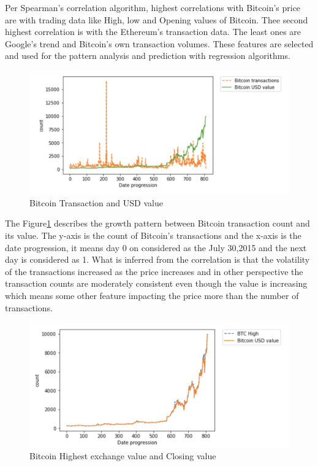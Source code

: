 \documentclass[sigconf]{acmart}
\begin{document}
Per Spearman's correlation algorithm, highest correlations with Bitcoin's price are with trading data like High, low and Opening values of Bitcoin. Thee second highest correlation is with the Ethereum's transaction data. The least ones are Google's trend and Bitcoin's own transaction volumes.
These features are selected and used for the pattern analysis and prediction with regression algorithms. 


\begin{figure}[!ht]
  \centering\includegraphics[width=\columnwidth]{images/BTC-prcvsBTC-trans.png}
  \caption{Bitcoin Transaction and USD value }
  \label{1}
\end{figure}

The Figure\ref{1} describes the growth pattern between Bitcoin transaction count and its value. The y-axis is the count of Bitcoin's transactions and the x-axis is the date progression, it means day 0 on considered as the July 30,2015 and the next day is considered as 1. What is inferred from the correlation is that the volatility of the transactions increased as the price increases and in other perspective the transaction counts are moderately consistent even though the value is increasing which means some other feature impacting the price more than the number of transactions. 

\begin{figure}[!ht]
  \centering\includegraphics[width=\columnwidth]{images/High.png}
  \caption{Bitcoin Highest exchange value and Closing value}
  \label{2}
\end{figure}
\end{document}
